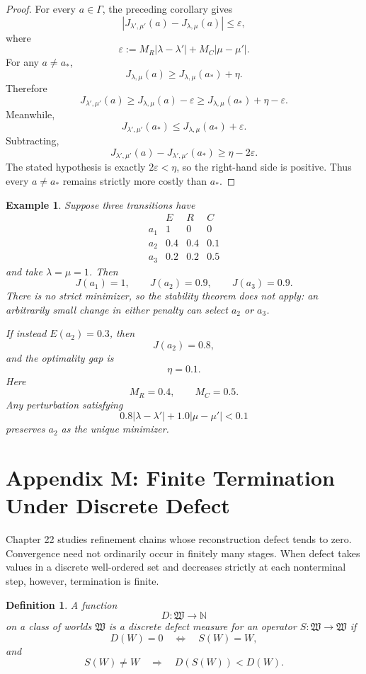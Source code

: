 \documentclass[11pt]{book}
\newtheorem*{appendixdefinition}{Definition}
\newtheorem*{appendixexample}{Example}
\begin{document}
\begin{proof}
For every $a\in\Gamma$, the preceding corollary gives
\[
\left|
J_{\lambda',\mu'}(a)-J_{\lambda,\mu}(a)
\right|
\leq
\varepsilon,
\]
where
\[
\varepsilon
:=
M_R|\lambda-\lambda'|
+
M_C|\mu-\mu'|.
\]
For any $a\neq a_\ast$,
\[
J_{\lambda,\mu}(a)
\geq
J_{\lambda,\mu}(a_\ast)+\eta.
\]
Therefore
\[
J_{\lambda',\mu'}(a)
\geq
J_{\lambda,\mu}(a)-\varepsilon
\geq
J_{\lambda,\mu}(a_\ast)+\eta-\varepsilon.
\]
Meanwhile,
\[
J_{\lambda',\mu'}(a_\ast)
\leq
J_{\lambda,\mu}(a_\ast)+\varepsilon.
\]
Subtracting,
\[
J_{\lambda',\mu'}(a)
-
J_{\lambda',\mu'}(a_\ast)
\geq
\eta-2\varepsilon.
\]
The stated hypothesis is exactly $2\varepsilon<\eta$, so the right-hand
side is positive. Thus every $a\neq a_\ast$ remains strictly more costly
than $a_\ast$.
\end{proof}

\begin{appendixexample}
Suppose three transitions have
\[
\begin{array}{c|ccc}
 &E&R&C\\ \hline
a_1&1&0&0\\
a_2&0.4&0.4&0.1\\
a_3&0.2&0.2&0.5
\end{array}
\]
and take $\lambda=\mu=1$. Then
\[
J(a_1)=1,
\qquad
J(a_2)=0.9,
\qquad
J(a_3)=0.9.
\]
There is no strict minimizer, so the stability theorem does not apply:
an arbitrarily small change in either penalty can select $a_2$ or $a_3$.

If instead $E(a_2)=0.3$, then
\[
J(a_2)=0.8,
\]
and the optimality gap is
\[
\eta=0.1.
\]
Here
\[
M_R=0.4,\qquad M_C=0.5.
\]
Any perturbation satisfying
\[
0.8|\lambda-\lambda'|
+
1.0|\mu-\mu'|
<
0.1
\]
preserves $a_2$ as the unique minimizer.
\end{appendixexample}


\chapter*{Appendix M: Finite Termination Under Discrete Defect}

Chapter 22 studies refinement chains whose reconstruction defect tends to
zero. Convergence need not ordinarily occur in finitely many stages.
When defect takes values in a discrete well-ordered set and decreases
strictly at each nonterminal step, however, termination is finite.

\begin{appendixdefinition}
A function
\[
D:\mathfrak W\longrightarrow\mathbb N
\]
on a class of worlds $\mathfrak W$ is a \emph{discrete defect measure} for
an operator $S:\mathfrak W\to\mathfrak W$ if
\[
D(W)=0
\quad\Longleftrightarrow\quad
S(W)=W,
\]
and
\[
S(W)\neq W
\quad\Longrightarrow\quad
D(S(W))<D(W).
\]
\end{appendixdefinition}
\end{document}
